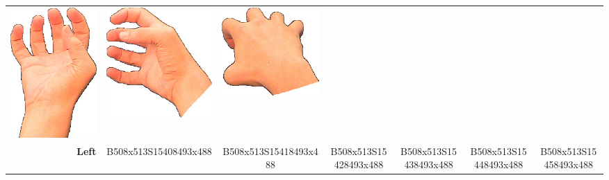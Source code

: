 \documentclass{article}
\begin{document}
\begin{center}
\begin{tabular}{r*{6}{c}}
\includegraphics[scale=0.1]{images/05-08-4.jpg}&
\includegraphics[scale=0.1]{images/05-08-5.jpg}&
\includegraphics[scale=0.1]{images/05-08-6.jpg}\\
\textbf{Left}&
B508x513S15408493x488&
B508x513S15418493x488&
B508x513S15428493x488&
B508x513S15438493x488&
B508x513S15448493x488&
B508x513S15458493x488\\
\end{tabular}
\end{center}
\end{document}
